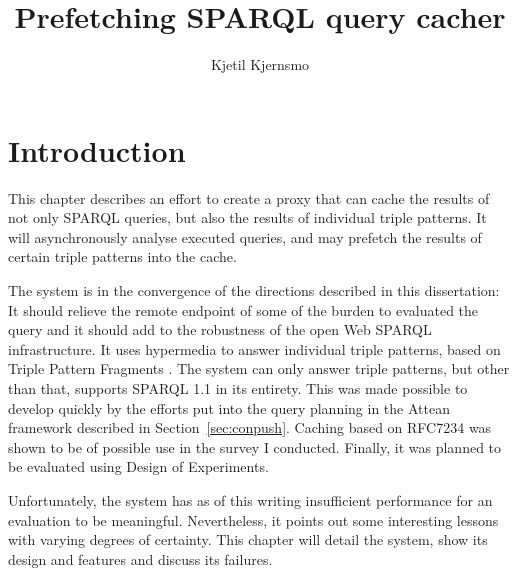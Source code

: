 \documentclass[a4paper, 12pt, draft]{article}
\begin{document}
\title{Prefetching SPARQL query cacher}
\author{Kjetil Kjernsmo}


\maketitle

\section{Introduction}

This chapter describes an effort to create a proxy that can cache the
results of not only SPARQL queries, but also the results of individual
triple patterns. It will asynchronously analyse executed queries, and
may prefetch the results of certain triple patterns into the cache.

The system is in the convergence of the directions described in this
dissertation: It should relieve the remote endpoint of some of the
burden to evaluated the query and it should add to the robustness of the
open Web SPARQL infrastructure. It uses hypermedia to answer individual
triple patterns, based on Triple Pattern Fragments  \cite{ldf1}. The
system can only answer triple patterns, but other than that, supports
SPARQL 1.1 in its entirety. This was made possible to develop quickly
by the efforts put into the query planning in the Attean framework
described in Section~\ref{sec:conpush}. Caching based on RFC7234
\cite{rfc7234} was shown to be of possible use in the survey I
conducted. Finally, it was planned to be evaluated using
Design of Experiments.

Unfortunately, the system has as of this writing insufficient
performance for an evaluation to be meaningful. Nevertheless, it
points out some interesting lessons with varying degrees of
certainty. This chapter will detail the system, show its design and
features and discuss its failures.
\end{document}
